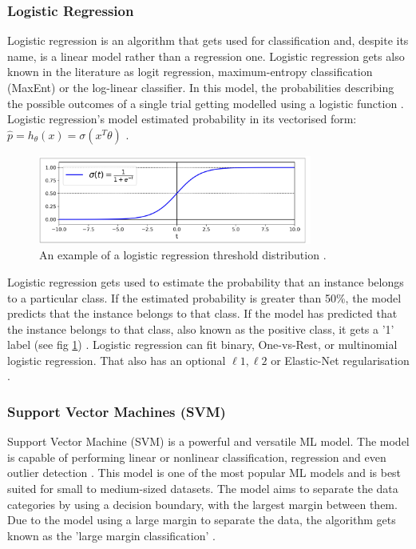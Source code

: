 	\subsubsection{Logistic Regression}
	
	Logistic regression is an algorithm that gets used for classification and, despite its name, is a linear model rather than a regression one. Logistic regression gets also known in the literature as logit regression, maximum-entropy classification (MaxEnt) or the log-linear classifier. In this model, the probabilities describing the possible outcomes of a single trial getting modelled using a logistic function \cite{sklearn_lr, handson_book}. Logistic regression's model estimated probability in its vectorised form: $\hat{p}=h_\theta(x) = \sigma(x^T\theta)$ \cite{geron2019hands}.
	
	\begin{figure}[t]
		\begin{center}
			\includegraphics[width=9cm]{graphics/logistic_reg.jpeg}
			\caption{An example of a logistic regression threshold distribution \cite{geron2019hands}.}
			\label{fig:logr_example}
		\end{center}
		
	\end{figure}
	
	Logistic regression gets used to estimate the probability that an instance belongs to a particular class. If the estimated probability is greater than 50\%, the model predicts that the instance belongs to that class. If the model has predicted that the instance belongs to that class, also known as the positive class, it gets a '1' label  (see fig \ref{fig:logr_example}) \cite{handson_book, geron2019hands}. Logistic regression can fit binary, One-vs-Rest, or multinomial logistic regression. That also has an optional $\ell1, \ell2$ or Elastic-Net regularisation \cite{sklearn_lr}.
	
	\subsubsection{Support Vector Machines (SVM)}
	Support Vector Machine (SVM) is a powerful and versatile ML model. The model is capable of performing linear or nonlinear classification, regression and even outlier detection \cite{geron2019hands, sklearn_svm}. This model is one of the most popular ML models and is best suited for small to medium-sized datasets. The model aims to separate the data categories by using a decision boundary, with the largest margin between them. Due to the model using a large margin to separate the data, the algorithm gets known as the 'large margin classification' \cite{geron2019hands}.
	
